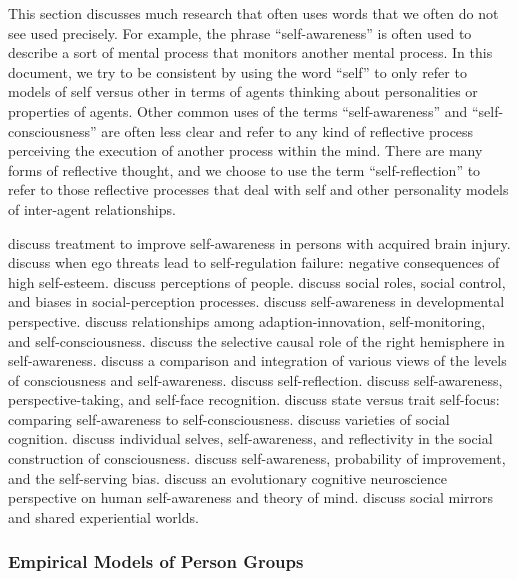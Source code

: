 This section discusses much research that often uses words that we often do not see used precisely.
For example, the phrase ``self-awareness'' is often used to describe a sort of mental process that monitors another mental process.
In this document, we try to be consistent by using the word ``self'' to only refer to models of self versus other in terms of agents thinking about personalities or properties of agents.
Other common uses of the terms ``self-awareness'' and ``self-consciousness'' are often less clear and refer to any kind of reflective process perceiving the execution of another process within the mind.
There are many forms of reflective thought, and we choose to use the term ``self-reflection'' to refer to those reflective processes that deal with self and other personality models of inter-agent relationships.

\cite{goverover2007tis} discuss treatment to improve self-awareness in persons with acquired brain injury.
\cite{baumeister1993etl} discuss when ego threats lead to self-regulation failure: negative consequences of high self-esteem.
\cite{gilbert2005ocb} discuss perceptions of people.
\cite{ross2005bispc} discuss social roles, social control, and biases in social-perception processes.
\cite{hobson2006sad} discuss self-awareness in developmental perspective.
\cite{hutchinson2007saa} discuss relationships among adaption-innovation, self-monitoring, and self-consciousness.
\cite{keenan2007crr} discuss the selective causal role of the right hemisphere in self-awareness.
\cite{morin2004lca} discuss a comparison and integration of various views of the levels of consciousness and self-awareness.
\cite{silverman2008osr} discuss self-reflection.
\cite{smith2007sap} discuss self-awareness, perspective-taking, and self-face recognition.
\cite{soeiro2008svtsf} discuss state versus trait self-focus: comparing self-awareness to self-consciousness.
\cite{uhlmann2008vsc} discuss varieties of social cognition.
\cite{burns1998scc} discuss individual selves, self-awareness, and reflectivity in the social construction of consciousness.
\cite{duval2002sap} discuss self-awareness, probability of improvement, and the self-serving bias.
\cite{focquaert2008ecn} discuss an evolutionary cognitive neuroscience perspective on human self-awareness and theory of mind.
\cite{whitehead2001sma} discuss social mirrors and shared experiential worlds.


\subsubsection{Empirical Models of Person Groups}

